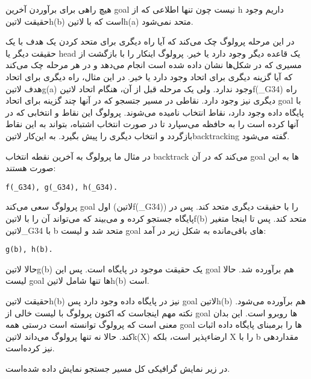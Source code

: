 هیچ راهی برای برآوردن آخرین goal نیست چون تنها اطلاعی که از h داریم وجود حقیقت ‌لاتین{h(b)} است که با ‌لاتین{h(a)} متحد نمی‌شود.

در این مرحله پرولوگ چک می‌کند که آیا راه دیگری برای متحد کردن یک هدف با یک حقیقت دیگر یا head یک قاعده دیگر وجود دارد یا خیر. پرولوگ اینکار را با بازگشت از مسیری که در شکل‌ها نشان داده شده است انجام می‌دهد و در هر مرحله چک می‌کند که آیا گزینه دیگری برای اتحاد وجود دارد یا خیر. در این مثال، راه دیگری برای اتحاد هدف ‌لاتین{g(a)} وجود ندارد. ولی یک مرحله قبل از آن، هنگام اتحاد ‌لاتین{f(\_G34)} راه دیگری نیز وجود دارد. نقاطی در مسیر جتسجو که در آنها چند گزینه برای اتحاد goal با پایگاه داده وجود دارد، نقاط انتخاب نامیده می‌شوند. پرولوگ این نقاط و انتخابی که در آنها کرده است را به حافظه می‌سپارد تا در صورت انتخاب اشتباه، بتواند به این نقاط بازگردد و انتخاب دیگری را پیش بگیرد. به این‌کار ‌لاتین{backtracking} گفته می‌شود.

در مثال ما پرولوگ به آخرین نقطه انتخاب backtrack می‌کند که در آن goal ها به این صورت هستند:

\begin{latin}
\begin{lstlisting}
f(_G34), g(_G34), h(_G34).
\end{lstlisting}
\end{latin}

پرولوگ سعی می‌کند goal اول (‌لاتین{f(\_G34)}) را با حقیقت دیگری متحد کند. پس در پایگاه جستجو کرده و می‌بیند که می‌تواند آن را با ‌لاتین{f(b)} متحد کند. پس تا اینجا متغیر ‌لاتین{\_G34} با b متحد شد و لیست goal های باقی‌مانده به شکل زیر در آمد:

\begin{latin}
\begin{lstlisting}
g(b), h(b).
\end{lstlisting}
\end{latin}
حالا ‌لاتین{g(b)} یک حقیقت موجود در پایگاه است. پس این goal هم برآورده شد. حالا لیست goal ها تنها شامل ‌لاتین{h(b)} است.

حقیقت ‌لاتین{h(b)} نیز در پایگاه داده وجود دارد پس goal ‌لاتین{h(b)} هم برآورده می‌شود. نکته مهم اینجاست که اکنون پرولوگ با لیست خالی از goal ها روبرو است. این بدان معنی است که پرولوگ توانسته است درستی همه goal ها را برمبنای پایگاه داده اثبات کند. حالا نه تنها پرولوگ می‌داند ‌لاتین{k(X)} ارضاء‌پذیر است، بلکه X را با b مقداردهی نیز کرده‌است.

در زیر نمایش گرافیکی کل مسیر جستجو نمایش داده شده‌است.


